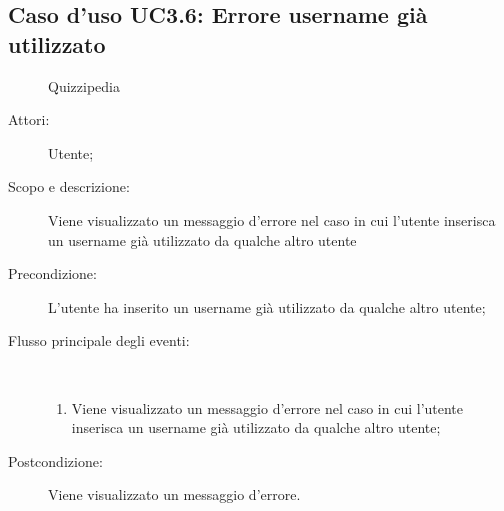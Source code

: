 \subsection{Caso d'uso UC3.6: Errore username già utilizzato}
	\begin{figure}[H]
		\centering
		\begin{resizedtikzpicture}{\textwidth}
		\begin{umlsystem}[x=0, fill=lightgray!20]{Quizzipedia}
		\end{umlsystem}
		\end{resizedtikzpicture}
		\caption{}
	\end{figure}
\begin{description}
\item[Attori:] Utente;
\item[Scopo e descrizione:] Viene visualizzato un messaggio d'errore nel caso in cui l'utente inserisca un username già utilizzato da qualche altro utente
      \item[Precondizione:] L'utente ha inserito un username già utilizzato da qualche altro utente;

        \item[Flusso principale degli eventi:] \ 
 \begin{enumerate}
          \item Viene visualizzato un messaggio d'errore nel caso in cui l'utente inserisca un username già utilizzato da qualche altro utente;

      \end{enumerate}
    \item[Postcondizione:] Viene visualizzato un messaggio d'errore.
  \end{description}
\hypertarget{UC3.7}{}
